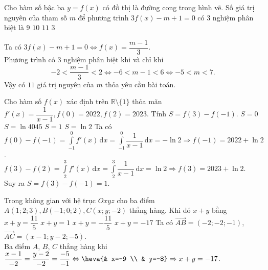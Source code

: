\begin{ex}%
\immini
{
Cho hàm số bậc ba $y=f(x)$ có đồ thị là đường cong trong hình vẽ. Số giá trị nguyên của tham số $m$ để phương trình $3f(x)-m+1=0$ có 3 nghiệm phân biệt là
\choice
{$9$}
{$10$}
{\True $11$}
{$3$}
}
{
}
\loigiai
{
Ta có $3f(x)-m+1=0\Leftrightarrow f(x)=\dfrac{m-1}{3}$.\\
Phương trình có $3$ nghiệm phân biệt khi và chỉ khi $$-2<\dfrac{m-1}{3}<2\Leftrightarrow -6<m-1<6\Leftrightarrow -5<m<7.$$
Vậy có $11$ giá trị nguyên của $m$ thỏa yêu cầu bài toán.
}
\end{ex}
\begin{ex}%
Cho hàm số $f(x)$ xác định trên $\mathbb{R}\setminus\{1\}$ thỏa mãn $f'(x)=\dfrac{1}{x-1},f(0)=2022,f(2)=2023$. Tính $S=f(3)-f(-1)$.
\choice
{$S=0$}
{$S=\ln 4045$}
{\True $S=1$}
{$S=\ln 2$}
\loigiai
{
Ta có $f(0)-f(-1)=\displaystyle\int\limits_{-1}^{0} f'(x) \mathrm{\,d}x=\displaystyle\int\limits_{-1}^{0} \dfrac{1}{x-1} \mathrm{\,d}x=-\ln 2\Rightarrow f(-1)=2022+\ln 2$.\\
$f(3)-f(2)=\displaystyle\int\limits_{2}^{3} f'(x) \mathrm{\,d}x=\displaystyle\int\limits_{2}^{3} \dfrac{1}{x-1} \mathrm{\,d}x=\ln 2\Rightarrow f(3)=2023+\ln 2$.\\
Suy ra $S=f(3)-f(-1)=1$.
}
\end{ex}

\begin{ex}%
Trong không gian với hệ trục $O x y z$ cho ba điểm $A(1;2;3),B(-1;0;2),C(x;y;-2)$ thẳng hàng. Khi đó $x+y$ bằng
\choice
{$x+y=\dfrac{11}{5}$}
{$x+y=1$}
{$x+y=-\dfrac{11}{5}$}
{\True $x+y=-17$}
\loigiai
{
Ta có $\overrightarrow{AB}=(-2;-2;-1)$, $\overrightarrow{AC}=(x-1;y-2;-5)$.\\
Ba điểm $A$, $B$, $C$ thẳng hàng khi $\dfrac{x-1}{-2}=\dfrac{y-2}{-2}=\dfrac{-5}{-1}\Leftrightarrow\heva{& x=-9 \\ & y=-8}\Rightarrow x+y=-17$.
}
\end{ex}

